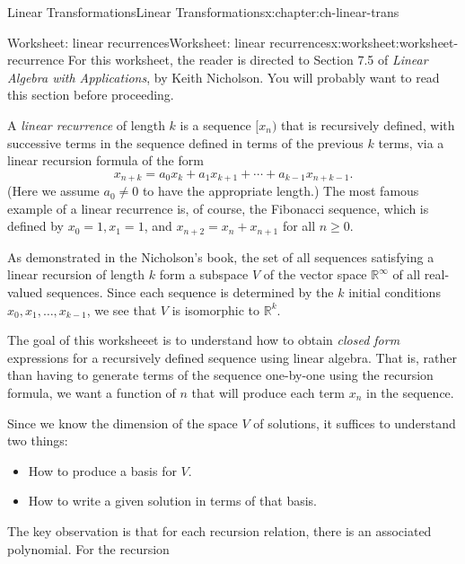 \documentclass[oneside,10pt,]{book}
\numberwithin{equation}{section}
\begin{document}
\begin{chapterptx}{Linear Transformations}{}{Linear Transformations}{}{}{x:chapter:ch-linear-trans}
\typeout{************************************************}
%
\begin{worksheet-section}{Worksheet: linear recurrences}{}{Worksheet: linear recurrences}{}{}{x:worksheet:worksheet-recurrence}
For this worksheet, the reader is directed to Section 7.5 of \emph{Linear Algebra with Applications}, by Keith Nicholson. You will probably want to read this section before proceeding.%
\par
A \emph{linear recurrence} of length \(k\) is a sequence \([x_n)\) that is recursively defined, with successive terms in the sequence defined in terms of the previous \(k\) terms, via a linear recursion formula of the form%
\begin{equation*}
x_{n+k} = a_0x_k + a_1x_{k+1}+\cdots + a_{k-1}x_{n+k-1}\text{.}
\end{equation*}
(Here we assume \(a_0\neq 0\) to have the appropriate length.) The most famous example of a linear recurrence is, of course, the Fibonacci sequence, which is defined by \(x_0=1, x_1=1\), and \(x_{n+2}=x_n+x_{n+1}\) for all \(n\geq 0\).%
\par
As demonstrated in the Nicholson's book, the set of all sequences satisfying a linear recursion of length \(k\) form a subspace \(V\) of the vector space \(\mathbb{R}^\infty\) of all real-valued sequences. Since each sequence is determined by the \(k\) initial conditions \(x_0, x_1, \ldots, x_{k-1}\), we see that \(V\) is isomorphic to \(\mathbb{R}^k\).%
\par
The goal of this worksheeet is to understand how to obtain \emph{closed form} expressions for a recursively defined sequence using linear algebra. That is, rather than having to generate terms of the sequence one-by-one using the recursion formula, we want a function of \(n\) that will produce each term \(x_n\) in the sequence.%
\par
Since we know the dimension of the space \(V\) of solutions, it suffices to understand two things:%
\begin{itemize}[label=\textbullet]
\item{}How to produce a basis for \(V\).%
\item{}How to write a given solution in terms of that basis.%
\end{itemize}
%
\par
The key observation is that for each recursion relation, there is an associated polynomial. For the recursion%

\end{worksheet-section}
\end{chapterptx}
\end{document}
